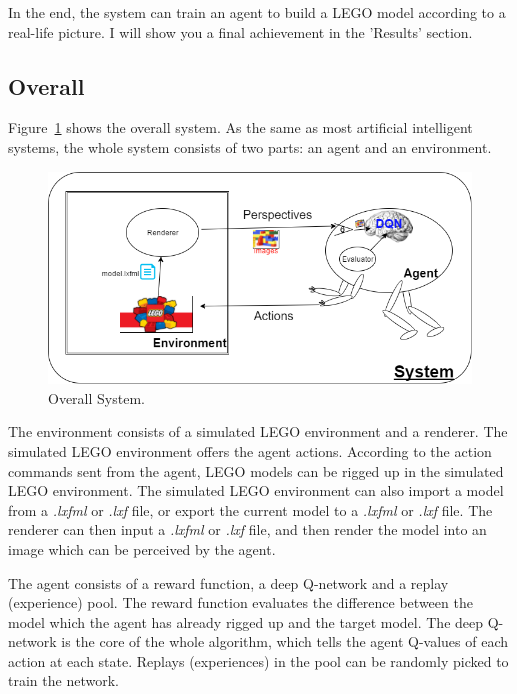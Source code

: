 \documentclass[a4paper]{article}
\begin{document}
        In the end, the system can train an agent to build a LEGO model according to a real-life picture. I will show you a final achievement in the 'Results' section.
    
        \subsection{Overall}
        
            Figure~\ref{fig:system1} shows the overall system. As the same as most artificial intelligent systems, the whole system consists of two parts: an agent and an environment.
            \begin{figure}[h]
                \centering
                \includegraphics[width=\textwidth]{agent_env.png}
                \caption{\label{fig:system1}Overall System.}
            \end{figure}
            
            The environment consists of a simulated LEGO environment and a renderer. The simulated LEGO environment offers the agent actions. According to the action commands sent from the agent, LEGO models can be rigged up in the simulated LEGO environment. The simulated LEGO environment can also import a model from a \textit{.lxfml} or \textit{.lxf} file, or export the current model to a \textit{.lxfml} or \textit{.lxf} file. The renderer can then input a \textit{.lxfml} or \textit{.lxf} file, and then render the model into an image which can be perceived by the agent. 
            
            The agent consists of a reward function, a deep Q-network and a replay (experience) pool. The reward function evaluates the difference between the model which the agent has already rigged up and the target model. The deep Q-network is the core of the whole algorithm, which tells the agent Q-values of each action at each state. Replays (experiences) in the pool can be randomly picked to train the network. 
            
\end{document}
